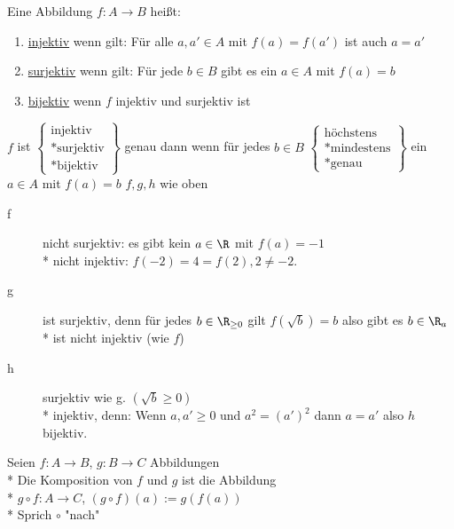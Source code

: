 Eine Abbildung $f: A \to B$ heißt:
\begin{enumerate}
\item{\ul{injektiv} wenn gilt: Für alle $a, a' \in A$ mit $f(a) = f(a')$ ist auch $a = a'$}
\item{\ul{surjektiv} wenn gilt: Für jede $b\in B$ gibt es ein $a\in A$ mit $f(a)=b$}
\item{\ul{bijektiv} wenn $f$ injektiv und surjektiv ist}
\end{enumerate}
%
%
%
\bem
$f$ ist $\left\{
\begin{array}{c}
\text{injektiv}\\*
\text{surjektiv}\\*
\text{bijektiv}
\end{array}
 \right\}$ genau dann wenn für jedes $b \in B$ $\left\{\begin{array}{c} \text{höchstens}\\* \text{mindestens}\\*
 \text{genau}
 \end{array} \right\}$ ein $a \in A$ mit $f(a) = b$
%
\bsp
$f,g,h$ wie oben
\begin{description}
\item[f]{
\hspace{6mm}nicht surjektiv: es gibt kein $a\in\R$ mit $f(a)=-1$\\*
nicht injektiv: $f(-2)=4=f(2), 2\neq -2.$}
%
\item[g]{
\hspace{5mm}ist surjektiv, denn für jedes $b \in \R_{\geq 0}$ gilt $f( \sqrt{b} ) = b$ also gibt es $b \in \R_a$\\*
 ist nicht injektiv (wie $f$)}
%
\item[h]{
\hspace{5mm}surjektiv wie g. $(\sqrt{b} \geq 0)$\\*
injektiv, denn: Wenn $a, a' \geq 0$ und $a^2 = (a')^2$ dann $a = a'$ also $h$ bijektiv.}
\end{description}

Seien $f:A→B$, $g:B→C$ Abbildungen\\*
Die Komposition von $f$ und $g$ ist die Abbildung\\*
$g \circ  f: A→C$, $(g \circ f)(a):=g(f(a))$\\*
Sprich $\circ$ "nach"
%

